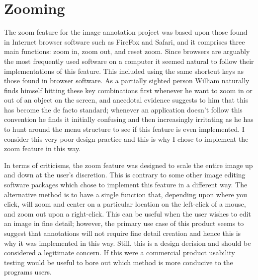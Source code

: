 \section{Zooming}
The zoom feature for the image annotation project was based upon those found in Internet browser software such as FireFox and Safari, and it comprises three main functions: zoom in, zoom out, and reset zoom.  Since browsers are arguably the most frequently used software on a computer it seemed natural to follow their implementations of this feature.  This included using the same shortcut keys as those found in browser software.  As a partially sighted person William naturally finds himself hitting these key combinations first whenever he want to zoom in or out of an object on the screen, and anecdotal evidence suggests to him that this has become the de facto standard; whenever an application doesn’t follow this convention he finds it initially confusing and then increasingly irritating as he has to  hunt around the menu structure to see if this feature is even implemented.  I consider this very poor design practice and this is why I chose to implement the zoom feature in this way.

In terms of criticisms, the zoom feature was designed to scale the entire image up and down at the user’s discretion.  This is contrary to some other image editing software packages which chose to implement this feature in a different way.  The alternative method is to have a single function that, depending upon where you click, will zoom and center on a particular location on the left-click of a mouse, and zoom out upon a right-click.  This can be useful when the user wishes to edit an image in fine detail; however, the primary use case of this product seems to suggest that annotations will not require fine detail creation and hence this is why it was implemented in this way.  Still, this is a design decision and should be considered a legitimate concern.  If this were a commercial product usability testing would be useful to bore out which method is more conducive to the programs users.